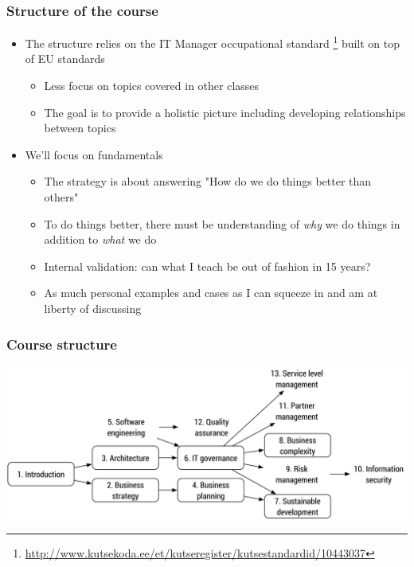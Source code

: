 \begin{frame}[fragile]
  \frametitle{Structure of the course}
	\begin{itemize}
		\item The structure relies on the IT Manager occupational standard \footnote{\url{http://www.kutsekoda.ee/et/kutseregister/kutsestandardid/10443037}} built on top of EU standards
			\begin{itemize}
				\item Less focus on topics covered in other classes
				\item The goal is to provide a holistic picture including developing relationships between topics
			\end{itemize}
		\item We'll focus on fundamentals
			\begin{itemize}
				\item The strategy is about answering "How do we do things better than others" \citep{de2006strategy}	
				\item To do things better, there must be understanding of \emph{why} we do things in addition to \emph{what} we do
				\item Internal validation: can what I teach be out of fashion in 15 years?
				\item As much personal examples and cases as I can squeeze in and am at liberty of discussing
			\end{itemize}
	\end{itemize}
\end{frame}

\begin{frame}[fragile]
  \frametitle{Course structure}
		\includegraphics[width=\textwidth]{aine_struktuur.pdf}
\end{frame}

